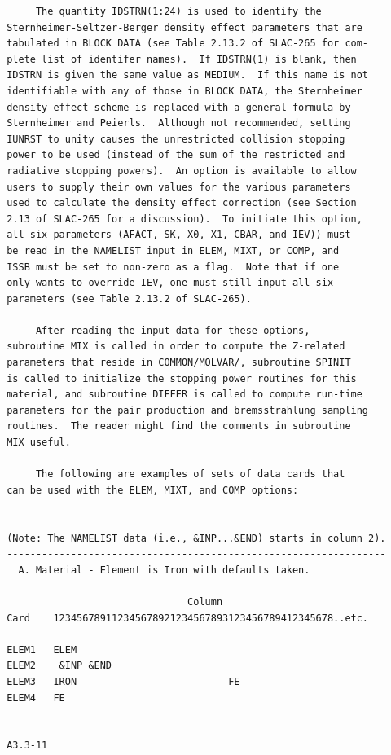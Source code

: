 \newpage \label{issb} 
  \begin{verbatim}
      The quantity IDSTRN(1:24) is used to identify the
 Sternheimer-Seltzer-Berger density effect parameters that are
 tabulated in BLOCK DATA (see Table 2.13.2 of SLAC-265 for com-
 plete list of identifer names).  If IDSTRN(1) is blank, then
 IDSTRN is given the same value as MEDIUM.  If this name is not
 identifiable with any of those in BLOCK DATA, the Sternheimer
 density effect scheme is replaced with a general formula by
 Sternheimer and Peierls.  Although not recommended, setting
 IUNRST to unity causes the unrestricted collision stopping
 power to be used (instead of the sum of the restricted and
 radiative stopping powers).  An option is available to allow
 users to supply their own values for the various parameters
 used to calculate the density effect correction (see Section
 2.13 of SLAC-265 for a discussion).  To initiate this option,
 all six parameters (AFACT, SK, X0, X1, CBAR, and IEV)) must
 be read in the NAMELIST input in ELEM, MIXT, or COMP, and
 ISSB must be set to non-zero as a flag.  Note that if one
 only wants to override IEV, one must still input all six
 parameters (see Table 2.13.2 of SLAC-265).
 
      After reading the input data for these options,
 subroutine MIX is called in order to compute the Z-related
 parameters that reside in COMMON/MOLVAR/, subroutine SPINIT
 is called to initialize the stopping power routines for this
 material, and subroutine DIFFER is called to compute run-time
 parameters for the pair production and bremsstrahlung sampling
 routines.  The reader might find the comments in subroutine
 MIX useful.
 
      The following are examples of sets of data cards that
 can be used with the ELEM, MIXT, and COMP options:
 

 (Note: The NAMELIST data (i.e., &INP...&END) starts in column 2).
 -----------------------------------------------------------------
   A. Material - Element is Iron with defaults taken.
 -----------------------------------------------------------------
                                Column
 Card    123456789112345678921234567893123456789412345678..etc.
 
 ELEM1   ELEM
 ELEM2    &INP &END
 ELEM3   IRON                          FE
 ELEM4   FE
 

 A3.3-11  
\end{verbatim} 
